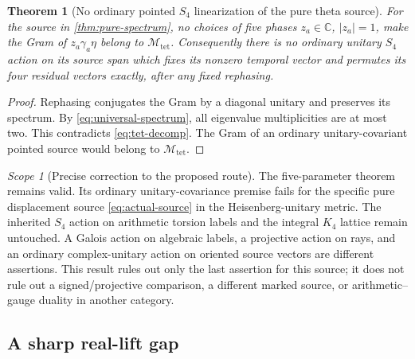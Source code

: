 \documentclass[11pt]{article}
\newtheorem{theorem}{Theorem}[section]
\theoremstyle{definition}
\theoremstyle{remark}
\newtheorem{scope}[scope]{Scope}
\newcommand{\C}{\mathbb C}
\newcommand{\Mtet}{\mathscr M_{\mathrm{tet}}}
\begin{document}
\begin{theorem}[No ordinary pointed $S_4$ linearization of the pure theta source]
\label{thm:no-S4}
For the source in \cref{thm:pure-spectrum}, no choices of five phases
$z_a\in\C$, $|z_a|=1$, make the Gram of $z_a\gamma_a\eta$ belong to
$\Mtet$. Consequently there is no ordinary unitary $S_4$ action on its source
span which fixes its nonzero temporal vector and permutes its four residual
vectors exactly, after any fixed rephasing.
\end{theorem}
\begin{proof}
Rephasing conjugates the Gram by a diagonal unitary and preserves its spectrum.
By \eqref{eq:universal-spectrum}, all eigenvalue multiplicities are at most
two. This contradicts \eqref{eq:tet-decomp}. The Gram of an ordinary
unitary-covariant pointed source would belong to $\Mtet$.
\end{proof}

\begin{scope}[Precise correction to the proposed route]
The five-parameter theorem remains valid. Its ordinary unitary-covariance
premise fails for the specific pure displacement source
\eqref{eq:actual-source} in the Heisenberg-unitary metric. The inherited
$S_4$ action on arithmetic torsion labels and the integral $K_4$ lattice
remain untouched. A Galois action on algebraic labels, a projective action on
rays, and an ordinary complex-unitary action on oriented source vectors are
different assertions. This result rules out only the last assertion for
this source; it does not rule out a signed/projective comparison, a different
marked source, or arithmetic--gauge duality in another category.
\end{scope}

\subsection{A sharp real-lift gap}
\end{document}
